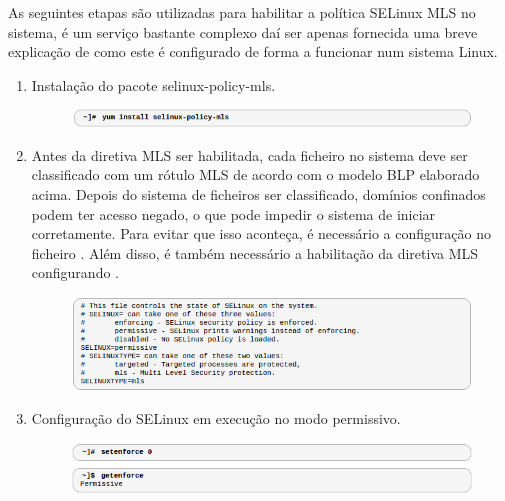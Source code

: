\documentclass[../tp2.tex]{subfiles}
\begin{document}
As seguintes etapas são utilizadas para habilitar a política SELinux MLS no sistema, é um serviço bastante complexo daí ser apenas fornecida uma breve explicação de como este é configurado de forma a funcionar num sistema Linux.\par 

\begin{enumerate}
\item Instalação do pacote selinux-policy-mls.\par
\begin{figure}[H]
\centering
\captionsetup{justification=centering,margin=2cm}
\centerline{\includegraphics[scale=0.7]{../imagens/install.png}}
\end{figure}


\item Antes da diretiva MLS ser habilitada, cada ficheiro no sistema deve ser classificado com um rótulo MLS de acordo com o modelo BLP elaborado acima. Depois do sistema de ficheiros ser classificado, domínios confinados podem ter acesso negado, o que pode impedir o sistema de iniciar corretamente. Para evitar que isso aconteça, é necessário a configuração  no ficheiro . Além disso, é também necessário a habilitação da diretiva MLS configurando .\par
\begin{figure}[H]
\centering
\captionsetup{justification=centering,margin=2cm}
\centerline{\includegraphics[scale=0.7]{../imagens/config.png}}
\end{figure}

\item Configuração do SELinux em execução no modo permissivo.\par
\begin{figure}[H]
\centering
\captionsetup{justification=centering,margin=2cm}
\centerline{\includegraphics[scale=0.7]{../imagens/permissivo.png}}
\end{figure}


\end{enumerate}
\end{document}
